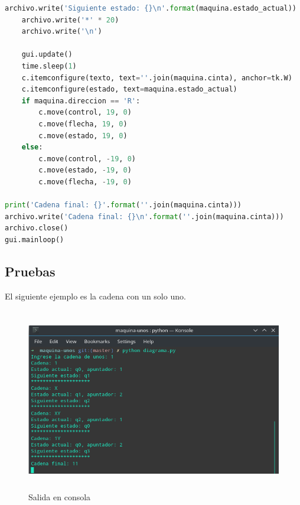 \begin{lstlisting}[language=Python]
    archivo.write('Siguiente estado: {}\n'.format(maquina.estado_actual))
    archivo.write('*' * 20)
    archivo.write('\n')

    gui.update()
    time.sleep(1)
    c.itemconfigure(texto, text=''.join(maquina.cinta), anchor=tk.W)
    c.itemconfigure(estado, text=maquina.estado_actual)
    if maquina.direccion == 'R':
        c.move(control, 19, 0)
        c.move(flecha, 19, 0)
        c.move(estado, 19, 0)
    else:
        c.move(control, -19, 0)
        c.move(estado, -19, 0)
        c.move(flecha, -19, 0)

print('Cadena final: {}'.format(''.join(maquina.cinta)))
archivo.write('Cadena final: {}\n'.format(''.join(maquina.cinta)))
archivo.close()
gui.mainloop()
\end{lstlisting}

\subsection{Pruebas}
El siguiente ejemplo es la cadena con un solo uno.

\begin{figure}[H]
\begin{center}
 \includegraphics[width=13cm, height=8cm]{./img/uno_consola.png}
 \caption{Salida en consola}
 \label{fig:uno_consola}
\end{center}
\end{figure}

